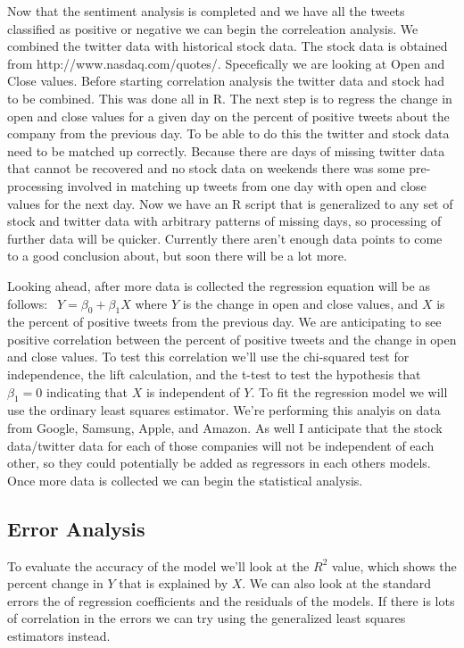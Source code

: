 \documentclass{acm_proc_article-sp}
\begin{document}
Now that the sentiment analysis is completed and we have all the tweets classified as positive or negative we can begin the correleation analysis. We combined the twitter data with historical stock data. The stock data is obtained from http://www.nasdaq.com/quotes/. Specefically we are looking at Open and Close values. Before starting correlation analysis the twitter data and stock had to be combined. This was done all in R. The next step is to regress the change in open and close values for a given day on the percent of positive tweets about the company from the previous day. To be able to do this the twitter and stock data need to be matched up correctly. Because there are days of missing twitter data that cannot be recovered and no stock data on weekends there was some pre-processing involved in matching up tweets from one day with open and close values for the next day. Now we have an R script that is generalized to any set of stock and twitter data with arbitrary patterns of missing days, so processing of further data will be quicker. Currently there aren't enough data points to come to a good conclusion about, but soon there will be a lot more.

Looking ahead, after more data is collected the regression equation will be as follows: $ \ \ Y = \beta_0 + \beta_1X $ where $Y$ is the change in open and close values, and $X$ is the percent of positive tweets from the previous day. We are anticipating to see positive correlation between the percent of positive tweets and the change in open and close values. To test this correlation we'll use the chi-squared test for independence, the lift calculation, and the t-test to test the hypothesis that $\beta_1 = 0$ indicating that $X$ is independent of $Y$. To fit the regression model we will use the ordinary least squares estimator. We're performing this analyis on data from Google, Samsung, Apple, and Amazon. As well I anticipate that the stock data/twitter data for each of those companies will not be independent of each other, so they could potentially be added as regressors in each others models. Once more data is collected we can begin the statistical analysis. 

\subsection{Error Analysis}

To evaluate the accuracy of the model we'll look at the $R^2$ value, which shows the percent change in $Y$ that is explained by $X$. We can also look at the standard errors the of regression coefficients and the residuals of the models. If there is lots of correlation in the errors we can try using the generalized least squares estimators instead. 
\end{document}

